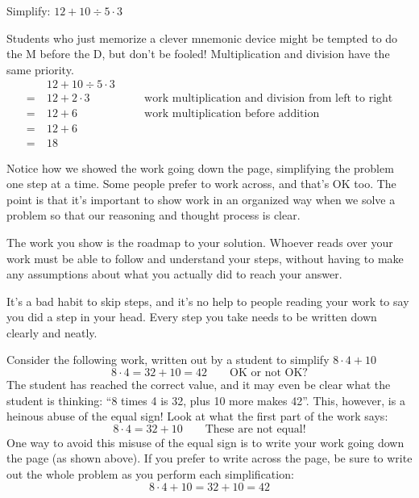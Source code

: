 \begin{boxedex}
Simplify: $12+10 \div 5 \cdot 3$

\exsoln{} Students who just memorize a clever mnemonic device might be tempted to do the M before the D, but don't be fooled! Multiplication and division have the same priority.
\[\begin{aligned}
	&~ 12+10 \div 5 \cdot 3\\
=	&~ 12+2 \cdot 3
&& \quad\text{work multiplication and division from left to right}\\
=	&~ 12+6
&& \quad\text{work multiplication before addition}\\
=	&~ 12+6\\
=	&~ 18
\end{aligned}\]
\end{boxedex}

Notice how we showed the work going down the page, simplifying the problem one step at a time. Some people prefer to work across, and that's OK too. The point is that it's important to show work in an organized way when we solve a problem so that our reasoning and thought process is clear.


The work you show is the roadmap to your solution. Whoever reads over your work must be able to follow and understand your steps, without having to make any assumptions about what you actually did to reach your answer.

It's a bad habit to skip steps, and it's no help to people reading your work to say you did a step in your head. Every step you take needs to be written down clearly and neatly.

\begin{boxedwarning}
Consider the following work, written out by a student to simplify $8 \cdot 4 + 10$ \[8 \cdot 4 = 32 + 10 = 42 \qquad\text{OK or not OK?}\]
The student has reached the correct value, and it may even be clear what the student is thinking: ``8 times 4 is 32, plus 10 more makes 42''. This, however, is a heinous abuse of the equal sign! Look at what the first part of the work says: \[8 \cdot 4 = 32 + 10 \qquad\text{These are not equal!}\]
One way to avoid this misuse of the equal sign is to write your work going down the page (as shown above). If you prefer to write across the page, be sure to write out the whole problem as you perform each simplification: \[8 \cdot 4 + 10 = 32 + 10 = 42\]
\end{boxedwarning}

